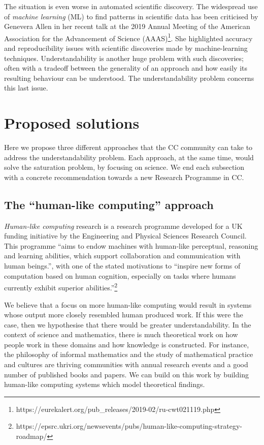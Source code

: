 \documentclass[letterpaper]{article}
\begin{document}
The situation is even worse in automated scientific discovery. The
widespread use of \emph{machine learning} (ML) to find patterns in
scientific data has been criticised by Genevera Allen in her recent
talk at the 2019 Annual Meeting of the American Association for the
Advancement of Science
(AAAS)\footnote{https://eurekalert.org/pub\_releases/2019-02/ru-cwt021119.php}. She
highlighted accuracy and reproducibility issues with scientific
discoveries made by machine-learning techniques. Understandability is
another huge problem with such discoveries; often with a tradeoff
between the generality of an approach and how easily its resulting
behaviour can be understood. The understandability problem concerns
this last issue. 


\section{Proposed solutions}
Here we propose three different approaches that the CC community can
take to address the understandability problem.  Each approach, at the
same time, would solve the saturation problem, by focusing on
science. We end each subsection with a concrete recommendation towards
a new Research Programme in CC.

\subsection{The ``human-like computing'' approach}

{\em Human-like computing} research is a research programme developed
for a UK funding initiative by the Engineering and Physical Sciences
Research Council. This programme ``aims to endow machines with
human-like perceptual, reasoning and learning abilities, which support
collaboration and communication with human beings.'', with one of the
stated motivations to ``inspire new forms of computation based on
human cognition, especially on tasks where humans currently exhibit
superior
abilities.''\footnote{https://epsrc.ukri.org/newsevents/pubs/human-like-computing-strategy-roadmap/}

We believe that a focus on more human-like computing would result in
systems whose output more closely resembled human produced work. If
this were the case, then we hypothesise that there would be greater
understandability.  In the context of science and mathematics, there
is much theoretical work on how people work in these domains and how
knowledge is constructed. For instance, the philosophy of informal
mathematics and the study of mathematical practice and cultures are
thriving communities with annual research events and a good number of
published books and papers. We can build on this work by building
human-like computing systems which model theoretical findings. 
\end{document}
